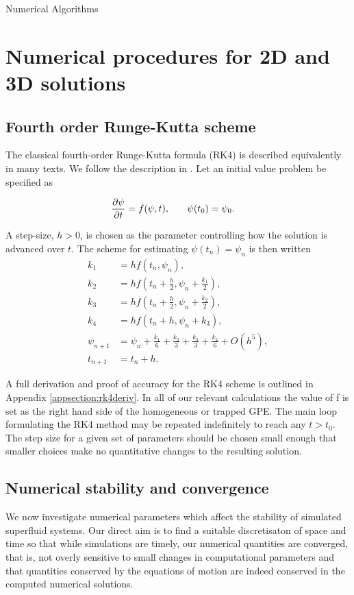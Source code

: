 \begin{chapter}{\label{cha:numerics}Numerical Algorithms}
\section{\label{section:RK} Numerical procedures for 2D and 3D solutions}
	\subsection{\label{section:RK4} Fourth order Runge-Kutta scheme}
	The classical fourth-order Runge-Kutta formula (RK4) is described equivalently in many texts. We follow the description in \cite{NumericalRecipes}. Let an initial value problem be specified as
	
	\begin{align*}
		\frac{\partial \psi}{\partial t} &= f(\psi,t),\hspace{0.25in}\psi(t_0) = \psi_0.
	\end{align*}

A step-size, $h>0$, is chosen as the parameter controlling how the solution is advanced over $t$. The scheme for estimating $\psi(t_n)= \psi_n$ is then written
\begin{equation}
\begin{split}
		k_1 &= hf(t_n,\psi_n),\\
		k_2 &= hf(t_n+\frac{h}{2},\psi_n+\frac{k_1}{2}),\\
		k_3 &= hf(t_n+\frac{h}{2},\psi_n+\frac{k_2}{2}),\\
		k_4 &= hf(t_n+h,\psi_n+k_3),\\
		\psi_{n+1} &= \psi_n + \frac{k_1}{6}+ \frac{k_2}{3}+ \frac{k_3}{3} + \frac{k_4}{6} + O(h^5),\\
		t_{n+1}  &= t_n + h.
		\label{eq:rk4}
\end{split}
\end{equation}


	A full derivation and proof of accuracy for the RK4 scheme is outlined in Appendix \ref{appsection:rk4deriv}.
	In all of our relevant calculations the value of f is set as the right hand side of the homogeneous or trapped GPE. The main loop formulating the RK4 method may be repeated indefinitely to reach any $t>t_0$. The step size for a given set of parameters should be chosen small enough that smaller choices make no quantitative changes to the resulting solution.

	\subsection{\label{section:numericalParams} Numerical stability and convergence}
	We now investigate numerical parameters which affect the stability of simulated superfluid systems. Our direct aim is to find a suitable discretisaton of space and time so that while simulations are timely, our numerical quantities are converged, that is, not overly sensitive to small changes in computational parameters and that quantities conserved by the equations of motion are indeed conserved in the computed numerical solutions.


\end{chapter}
